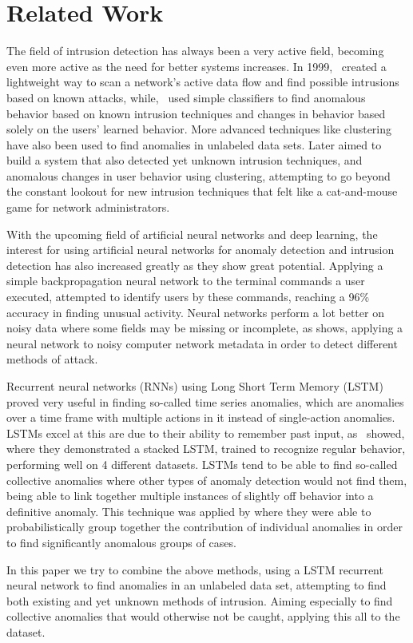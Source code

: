 \chapter{Related Work}\label{ch:related_work}

The field of intrusion detection has always been a very active field, becoming even more active as the need for better systems increases. In 1999,~\cite{roesch1999snort} created a lightweight way to scan a network's active data flow and find possible intrusions based on known attacks, while,~\cite{lee1998data} used simple classifiers to find anomalous behavior based on known intrusion techniques and changes in behavior based solely on the users' learned behavior. More advanced techniques like clustering have also been used to find anomalies in unlabeled data sets. Later \cite{Portnoy01intrusiondetection} aimed to build a system that also detected yet unknown intrusion techniques, and anomalous changes in user behavior using clustering, attempting to go beyond the constant lookout for new intrusion techniques that felt like a cat-and-mouse game for network administrators.

With the upcoming field of artificial neural networks and deep learning, the interest for using artificial neural networks for anomaly detection and intrusion detection has also increased greatly as they show great potential. Applying a simple backpropagation neural network to the terminal commands a user executed, \cite{ryan1998intrusion} attempted to identify users by these commands, reaching a 96\% accuracy in finding unusual activity. Neural networks perform a lot better on noisy data where some fields may be missing or incomplete, as \cite{cannady1998artificial} shows, applying a neural network to noisy computer network metadata in order to detect different methods of attack.

Recurrent neural networks (RNNs) using Long Short Term Memory (LSTM) proved very useful in finding so-called time series anomalies, which are anomalies over a time frame with multiple actions in it instead of single-action anomalies. LSTMs excel at this are due to their ability to remember past input, as~\cite{malhotra2015long} showed, where they demonstrated a stacked LSTM, trained to recognize regular behavior, performing well on 4 different datasets. LSTMs tend to be able to find so-called collective anomalies where other types of anomaly detection would not find them, being able to link together multiple instances of slightly off behavior into a definitive anomaly. This technique was applied by \cite{olsson2015probabilistic} where they were able to probabilistically group together the contribution of individual anomalies in order to find significantly anomalous groups of cases.

In this paper we try to combine the above methods, using a LSTM recurrent neural network to find anomalies in an unlabeled data set, attempting to find both existing and yet unknown methods of intrusion. Aiming especially to find collective anomalies that would otherwise not be caught, applying this all to the~\cite{akent-2015-enterprise-data} dataset. 